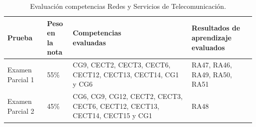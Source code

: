 \documentclass[xcolor=table,xcolor=x11names]{beamer}
\begin{document}
\begin{frame}{\subsecname}

\begin{table}
    \small
    \centering
\begin{tabular}{ p{3cm} | p{1.25cm} | p{3cm} | p{2cm} }
    \toprule
\textbf{Prueba} & \makecell{\bf Peso en \\ \bf la nota} & \makecell{\bf Competencias\\\bf evaluadas} & \makecell{\bf Resultados de \\\bf aprendizaje \\\bf evaluados} \\ \midrule
 \rowcolor{upmblue!20} Examen Parcial 1 & 55\% & CG9, CECT2,
CECT3, CECT6,
CECT12, CECT13,
CECT14, CG1 y CG6
 & RA47, RA46, RA49,
RA50, RA51 \\ 
 Examen Parcial 2 & 45\% & CG6, CG9, CG12,
CECT2, CECT3,
CECT6, CECT12,
CECT13, CECT14,
CECT15 y CG1
 & RA48
 \\ \bottomrule
\end{tabular}
\caption{Evaluación competencias Redes y Servicios de Telecomunicación.}
\label{table:evaluacion-competencias-rser}
\end{table}
\end{frame}
\end{document}
